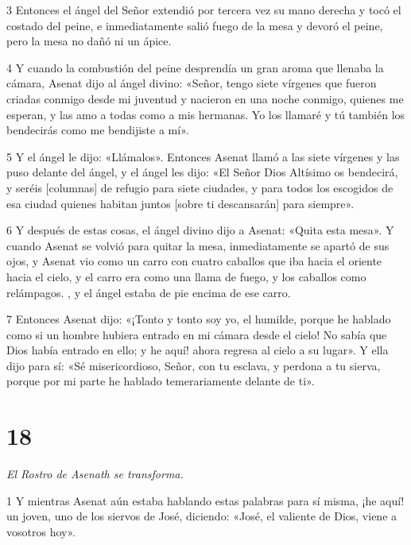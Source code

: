 \par 3 Entonces el ángel del Señor extendió por tercera vez su mano derecha y tocó el costado del peine, e inmediatamente salió fuego de la mesa y devoró el peine, pero la mesa no dañó ni un ápice.

\par 4 Y cuando la combustión del peine desprendía un gran aroma que llenaba la cámara, Asenat dijo al ángel divino: «Señor, tengo siete vírgenes que fueron criadas conmigo desde mi juventud y nacieron en una noche conmigo, quienes me esperan, y las amo a todas como a mis hermanas. Yo los llamaré y tú también los bendecirás como me bendijiste a mí».

\par 5 Y el ángel le dijo: «Llámalos». Entonces Asenat llamó a las siete vírgenes y las puso delante del ángel, y el ángel les dijo: «El Señor Dios Altísimo os bendecirá, y seréis [columnas] de refugio para siete ciudades, y para todos los escogidos de esa ciudad quienes habitan juntos [sobre ti descansarán] para siempre».

\par 6 Y después de estas cosas, el ángel divino dijo a Asenat: «Quita esta mesa». Y cuando Asenat se volvió para quitar la mesa, inmediatamente se apartó de sus ojos, y Asenat vio como un carro con cuatro caballos que iba hacia el oriente hacia el cielo, y el carro era como una llama de fuego, y los caballos como relámpagos. , y el ángel estaba de pie encima de ese carro.

\par 7 Entonces Asenat dijo: «¡Tonto y tonto soy yo, el humilde, porque he hablado como si un hombre hubiera entrado en mi cámara desde el cielo! No sabía que Dios había entrado en ello; y he aquí! ahora regresa al cielo a su lugar». Y ella dijo para sí: «Sé misericordioso, Señor, con tu esclava, y perdona a tu sierva, porque por mi parte he hablado temerariamente delante de ti».

\chapter{18}

\par \textit{El Rostro de Asenath se transforma.}

\par 1 Y mientras Asenat aún estaba hablando estas palabras para sí misma, ¡he aquí! un joven, uno de los siervos de José, diciendo: «José, el valiente de Dios, viene a vosotros hoy».

